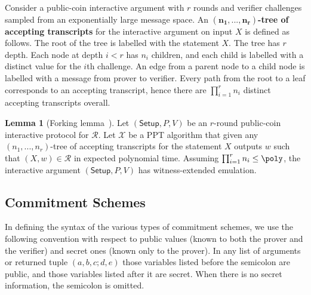 \documentclass{article}
\theoremstyle{definition}
\newtheorem{lemma}{Lemma}
\begin{document}
Consider a public-coin interactive argument with $r$ rounds and verifier challenges sampled from an exponentially large message space. An \textbf{$\mathbf{(n_1,...,n_r)}$-tree of accepting transcripts} for the interactive argument on input $X$ is defined as follows. The root of the tree is labelled with the statement $X$. The tree has $r$ depth. Each node at depth $i < r$ has $n_i$ children, and each child is labelled with a distinct value for the $i$th challenge. An edge from a parent node to a child node is labelled with a message from prover to verifier. Every path from the root to a leaf corresponds to an accepting transcript, hence there are $\prod_{i=1}^r n_i$ distinct accepting transcripts overall. 

\begin{lemma}[Forking lemma~\cite{EC:BCCGP16}] 
Let $(\textsf{Setup}, P, V)$ be an $r$-round public-coin interactive protocol for $\mathcal{R}$. Let $\mathcal{X}$ be a PPT algorithm that given any $(n_1,...,n_r)$-tree of accepting transcripts for the statement $X$ outputs $w$ such that $(X, w) \in \mathcal{R}$ in expected polynomial time. Assuming $\prod_{i=1}^r n_i \leq \poly$, the interactive argument $(\textsf{Setup}, P, V)$ has witness-extended emulation. 
\end{lemma}

\subsection{Commitment Schemes}

In defining the syntax of the various types of commitment schemes, we use the following convention with respect to public values (known to both the prover and the verifier) and secret ones (known only to the prover). In any list of arguments or returned tuple $(a, b, c; d, e)$ those variables listed before the semicolon are public, and those variables listed after it are secret. When there is no secret information, the semicolon is omitted.
\end{document}
